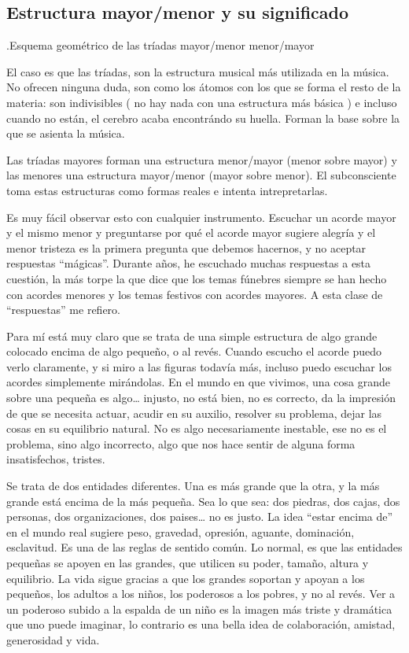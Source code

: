 \documentclass[]{article}
\begin{document}
\subsection{Estructura mayor/menor y su significado}

.Esquema geométrico de las tríadas mayor/menor menor/mayor

El caso es que las tríadas, son la estructura musical más utilizada en la música. No ofrecen ninguna duda, son como los átomos con los que se forma el resto de la materia: son indivisibles ( no hay nada con una estructura más básica ) e incluso cuando no están, el cerebro acaba encontrándo su huella. Forman la base sobre la que se asienta la música.

 Las tríadas mayores forman una estructura menor/mayor (menor sobre mayor) y las menores una estructura mayor/menor (mayor sobre menor). El subconsciente toma estas estructuras como formas reales e intenta intrepretarlas.

Es muy fácil observar esto con cualquier instrumento. Escuchar un acorde mayor y el mismo menor y preguntarse por qué el acorde mayor sugiere alegría y el menor tristeza es la primera pregunta que debemos hacernos, y no aceptar respuestas ``mágicas''. Durante años, he escuchado muchas respuestas a esta cuestión, la más torpe la que dice que los temas fúnebres siempre se han hecho con acordes menores y los temas festivos con acordes mayores. A esta clase de ``respuestas'' me refiero.

Para mí está muy claro que se trata de una simple estructura de algo grande colocado encima de algo pequeño, o al revés. Cuando escucho el acorde puedo verlo claramente, y si miro a las figuras todavía más, incluso puedo escuchar los acordes simplemente mirándolas. En el mundo en que vivimos, una cosa grande sobre una pequeña es algo\ldots{} injusto, no está bien, no es correcto, da la impresión de que se necesita actuar, acudir en su auxilio, resolver su problema, dejar las cosas en su equilibrio natural. No es algo necesariamente inestable, ese no es el problema, sino algo incorrecto, algo que nos hace sentir de alguna forma insatisfechos, tristes.

Se trata de dos entidades diferentes. Una es más grande que la otra, y la más grande está encima de la más pequeña. Sea lo que sea: dos piedras, dos cajas, dos personas, dos organizaciones, dos paises\ldots{} no es justo. La idea ``estar encima de'' en el mundo real sugiere peso, gravedad, opresión, aguante, dominación, esclavitud. Es una de las reglas de sentido común. Lo normal, es que las entidades pequeñas se apoyen en las grandes, que utilicen su poder, tamaño, altura y equilibrio. La vida sigue gracias a que los grandes soportan y apoyan a los pequeños, los adultos a los niños, los poderosos a los pobres, y no al revés. Ver a un poderoso subido a la espalda de un niño es la imagen más triste y dramática que uno puede imaginar, lo contrario es una bella idea de colaboración, amistad, generosidad y vida.
\end{document}

